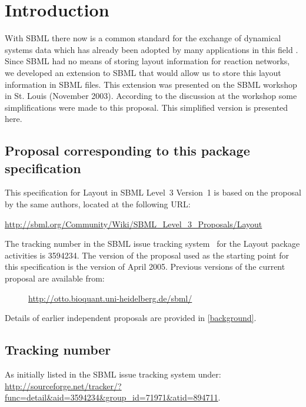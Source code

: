 \section{Introduction}

With SBML there now is a common standard for the exchange of dynamical systems data which has already 
been adopted by many applications in this field \cite{SBMLWebsite,sbml3core,SBMLArticle}. Since SBML 
had no means of storing layout information for reaction networks, we developed an extension to SBML 
that would allow us to store this layout information in SBML files. 
This extension was presented on the SBML workshop in St. Louis (November 2003). According to the discussion
at the workshop some simplifications were made to this proposal. This simplified version is presented here.



\subsection{Proposal corresponding to this package specification}

This specification for Layout in SBML Level~3
Version~1 is based on the proposal by the same authors, located at the
following URL:

\begin{center}
  \vspace*{1ex}\small
  \url{http://sbml.org/Community/Wiki/SBML_Level_3_Proposals/Layout}
  \vspace*{1ex}
\end{center}

The tracking number in the SBML issue tracking system~\citep{tracker}
for the Layout package activities is 3594234.  The
version of the proposal used as the starting point for this
specification is the version of April 2005. Previous versions of the current proposal are available from:
\begin{description}
  \item [] \small{\url{http://otto.bioquant.uni-heidelberg.de/sbml/}}  
\end{description}
Details of earlier independent proposals are provided in \ref{background}.

\subsection{Tracking number}
As initially listed in the SBML issue tracking system under: \url{http://sourceforge.net/tracker/?func=detail&aid=3594234&group_id=71971&atid=894711}.

